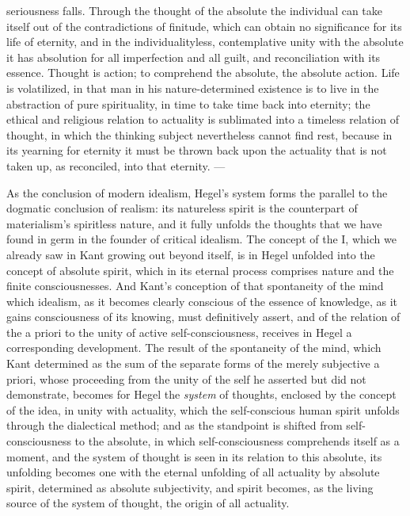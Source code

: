 seriousness falls. Through the thought of the absolute the individual
can take itself out of the contradictions of finitude, which can obtain
no significance for its life of eternity, and in the individualityless,
contemplative unity with the absolute it has absolution for all
imperfection and all guilt, and reconciliation with its essence.
Thought is action; to comprehend the absolute, the absolute action.
Life is volatilized, in that man in his nature-determined existence is
to live in the abstraction of pure spirituality, in time to take time
back into eternity; the ethical and religious relation to actuality is
sublimated into a timeless relation of thought, in which the thinking
subject nevertheless cannot find rest, because in its yearning for
eternity it must be thrown back upon the actuality that is not taken up,
as reconciled, into that eternity. ---

As the conclusion of modern idealism, Hegel's system forms
the parallel to the dogmatic conclusion of realism: its natureless
spirit is the counterpart of materialism's spiritless nature, and it
fully unfolds the thoughts that we have found in germ in the founder of
critical idealism. The concept of the I, which we already saw in Kant
growing out beyond itself, is in Hegel unfolded into the concept of
absolute spirit, which in its eternal process comprises nature and the
finite consciousnesses. And Kant's conception of that spontaneity of
the mind which idealism, as it becomes clearly conscious of the essence
of knowledge, as it gains consciousness of its knowing, must definitively
assert, and of the relation of the a priori to the unity of active
self-consciousness, receives in Hegel a corresponding development. The
result of the spontaneity of the mind, which Kant determined as the sum
of the separate forms of the merely subjective a priori, whose
proceeding from the unity of the self he asserted but did not
demonstrate, becomes for Hegel the \emph{system} of thoughts, enclosed
by the concept of the idea, in unity with actuality, which the
self-conscious human spirit unfolds through the dialectical method; and
as the standpoint is shifted from self-consciousness to the absolute,
in which self-consciousness comprehends itself as a moment, and the
system of thought is seen in its relation to this absolute, its
unfolding becomes one with the eternal unfolding of all actuality by
absolute spirit, determined as absolute subjectivity, and spirit
becomes, as the living source of the system of thought, the origin of
all actuality.

